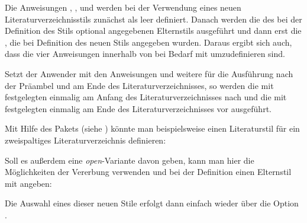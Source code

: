 Die Anweisungen , , 
und  werden bei der Verwendung eines neuen
Literaturverzeichnisstils zunächst als leer definiert. Danach werden die
 des bei der Definition des Stils optional angegebenen
Elternstils ausgeführt und dann erst die , die bei
Definition des neuen Stils angegeben wurden. Daraus ergibt sich auch, %
\iffalse %
dass jede der vier Anweisungen innerhalb von \PName{Anweisung} bei Bedarf
keinesfalls mit \Macro{newcommand}, sondern mit
\Macro{renewcommand}\IndexCmd{renewcommand}\important{\Macro{renewcommand}}
definiert werden sollte.%
\else%
\enlargethispage{3pt}%
dass die vier Anweisungen innerhalb von  bei Bedarf mit
umzudefinieren sind.%
\par\enlargethispage{3pt}%
\fi%

Setzt der Anwender mit den Anweisungen
 und
%
 weitere  für die
Ausführung nach der Präambel und am Ende des Literaturverzeichnisses, so
werden die mit  festgelegten
 einmalig am Anfang des Literaturverzeichnisses nach
 und die mit 
festgelegten  einmalig am Ende des Literaturverzeichnisses
vor  ausgeführt.

Mit Hilfe des Pakets
 (siehe
\cite{package:multicol}) könnte man beispielsweise einen Literaturstil für ein
zweispaltiges Literaturverzeichnis definieren:
\begin{lstcode}
\end{lstcode}
Soll es außerdem eine \emph{open}-Variante davon geben, kann man hier die
Möglichkeiten der Vererbung verwenden und bei der Definition einen Elternstil
mit angeben:
\begin{lstcode}
\end{lstcode}
Die Auswahl eines dieser neuen Stile erfolgt dann einfach wieder über die
Option .

